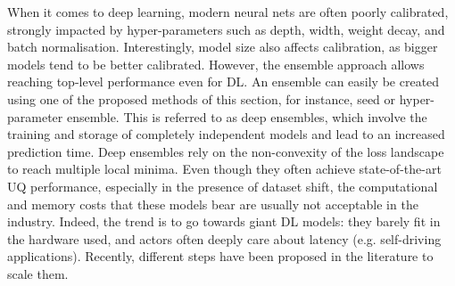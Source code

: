 

When it comes to deep learning, modern neural nets are often poorly calibrated, strongly impacted by hyper-parameters such as depth, width, weight decay, and batch normalisation\cite{calibrationDeepNets}. Interestingly, model size also affects calibration, as bigger models tend to be better calibrated.  %
However, the ensemble approach allows reaching top-level performance even for DL. An ensemble can easily be created using one of the proposed methods of this section, for instance, seed or hyper-parameter ensemble. This is referred to as deep ensembles\cite{deepEnsembles}, which involve the training and storage of completely independent models and lead to an increased prediction time. %
Deep ensembles rely on the non-convexity of the loss landscape to reach multiple local minima. Even though they often achieve state-of-the-art UQ performance, especially in the presence of dataset shift\cite{evalUQDatasetShift}, the computational and memory costs that these models bear are usually not acceptable in the industry. Indeed, the trend is to go towards giant DL models: they barely fit in the hardware used, and actors often deeply care about latency (e.g. self-driving applications). Recently, different steps have been proposed in the literature to scale them.



